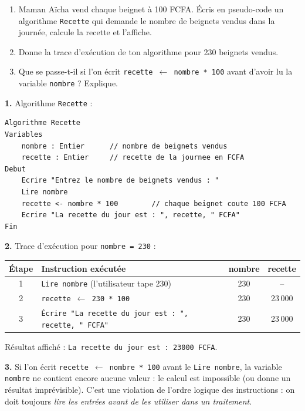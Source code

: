\documentclass[11pt]{article}
\begin{document}
\begin{exercice}
\begin{enumerate}
  \item Maman Aïcha vend chaque beignet à 100 FCFA. Écris en pseudo-code un algorithme \texttt{Recette} qui demande le nombre de beignets vendus dans la journée, calcule la recette et l'affiche.
  \item Donne la trace d'exécution de ton algorithme pour 230 beignets vendus.
  \item Que se passe-t-il si l'on écrit \texttt{recette $\leftarrow$ nombre * 100} avant d'avoir lu la variable \texttt{nombre} ? Explique.
\end{enumerate}
\end{exercice}

\begin{corrige}
\textbf{1.} Algorithme \texttt{Recette} :
\begin{lstlisting}
Algorithme Recette
Variables
    nombre : Entier      // nombre de beignets vendus
    recette : Entier     // recette de la journee en FCFA
Debut
    Ecrire "Entrez le nombre de beignets vendus : "
    Lire nombre
    recette <- nombre * 100        // chaque beignet coute 100 FCFA
    Ecrire "La recette du jour est : ", recette, " FCFA"
Fin
\end{lstlisting}

\textbf{2.} Trace d'exécution pour \texttt{nombre = 230} :
\begin{center}
\begin{tabularx}{\linewidth}{|c|X|c|c|}
\hline
\rowcolor{popblueL}
\textbf{Étape} & \textbf{Instruction exécutée} & \textbf{nombre} & \textbf{recette} \\
\hline
1 & \texttt{Lire nombre} (l'utilisateur tape 230) & 230 & -- \\
\hline
2 & \texttt{recette $\leftarrow$ 230 * 100} & 230 & 23\,000 \\
\hline
3 & \texttt{Écrire "La recette du jour est : ", recette, " FCFA"} & 230 & 23\,000 \\
\hline
\end{tabularx}
\end{center}
Résultat affiché : \texttt{La recette du jour est : 23000 FCFA}.

\textbf{3.} Si l'on écrit \texttt{recette $\leftarrow$ nombre * 100} avant le \texttt{Lire nombre}, la variable \texttt{nombre} ne contient encore aucune valeur : le calcul est impossible (ou donne un résultat imprévisible). C'est une violation de l'ordre logique des instructions : on doit toujours \emph{lire les entrées avant de les utiliser dans un traitement}.
\end{corrige}
\end{document}
